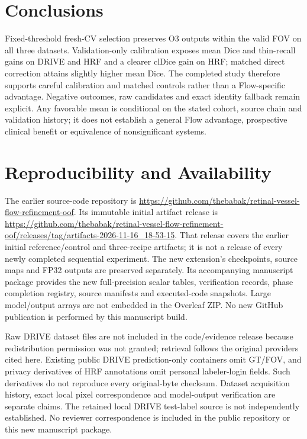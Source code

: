 \documentclass[jimaging,article,submit,pdftex,moreauthors]{Definitions/mdpi}
\begin{document}
\section{Conclusions}
Fixed-threshold fresh-CV selection preserves O3 outputs within the valid FOV on all three datasets. Validation-only calibration exposes mean Dice and thin-recall gains on DRIVE and HRF and a clearer clDice gain on HRF; matched direct correction attains slightly higher mean Dice. The completed study therefore supports careful calibration and matched controls rather than a Flow-specific advantage. Negative outcomes, raw candidates and exact identity fallback remain explicit. Any favorable mean is conditional on the stated cohort,
source chain and validation history; it does not establish a general Flow
advantage, prospective clinical benefit or equivalence of nonsignificant systems.

\section*{Reproducibility and Availability}
The earlier source-code repository is
\url{https://github.com/thebabak/retinal-vessel-flow-refinement-oof}.
Its immutable initial artifact release is
\url{https://github.com/thebabak/retinal-vessel-flow-refinement-oof/releases/tag/artifacts-2026-11-16_18-53-15}.
That release covers the earlier initial reference/control and
three-recipe artifacts; it is not a release of every newly completed
sequential experiment. The new extension's checkpoints, source maps and FP32
outputs are preserved separately. Its accompanying manuscript package provides
the new full-precision scalar tables, verification records, phase completion
registry, source manifests and executed-code snapshots. Large model/output
arrays are not embedded in the Overleaf ZIP. No new GitHub publication is
performed by this manuscript build.

Raw DRIVE dataset files are not included in the code/evidence release because
redistribution permission was not granted; retrieval follows the original
providers cited here. Existing public DRIVE prediction-only containers omit
GT/FOV, and privacy derivatives of HRF annotations omit personal labeler-login
fields. Such derivatives do not reproduce every original-byte checksum.
Dataset acquisition history, exact local pixel correspondence and model-output
verification are separate claims. The retained local DRIVE test-label source
is not independently established. No reviewer correspondence is included in
the public repository or this new manuscript package.
\end{document}
